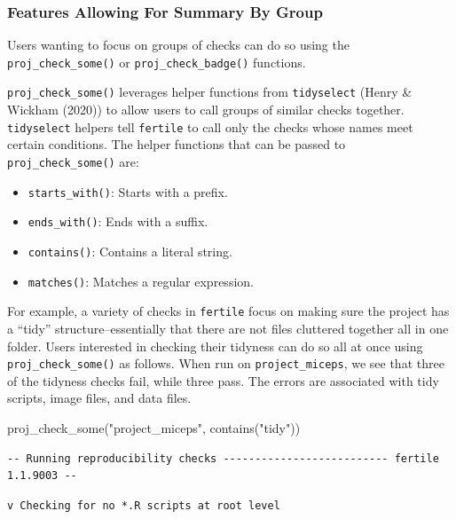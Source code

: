 \documentclass[12pt,twoside]{reedthesis}
\newenvironment{Shaded}{\begin{snugshade}}{\end{snugshade}}
\newcommand{\FunctionTok}[1]{\textcolor[rgb]{0.00,0.00,0.00}{#1}}
\newcommand{\NormalTok}[1]{#1}
\newcommand{\StringTok}[1]{\textcolor[rgb]{0.31,0.60,0.02}{#1}}
\providecommand{\tightlist}{%
  \setlength{\itemsep}{0pt}\setlength{\parskip}{0pt}}
\begin{document}
\hypertarget{features-allowing-for-summary-by-group}{%
\subsubsection{Features Allowing For Summary By Group}\label{features-allowing-for-summary-by-group}}

Users wanting to focus on groups of checks can do so using the \texttt{proj\_check\_some()} or \texttt{proj\_check\_badge()} functions.

\texttt{proj\_check\_some()} leverages helper functions from \texttt{tidyselect} (Henry \& Wickham (2020)) to allow users to call groups of similar checks together. \texttt{tidyselect} helpers tell \texttt{fertile} to call only the checks whose names meet certain conditions. The helper functions that can be passed to \texttt{proj\_check\_some()} are:
\begin{itemize}
\tightlist
\item
  \texttt{starts\_with()}: Starts with a prefix.
\item
  \texttt{ends\_with()}: Ends with a suffix.
\item
  \texttt{contains()}: Contains a literal string.
\item
  \texttt{matches()}: Matches a regular expression.
\end{itemize}
For example, a variety of checks in \texttt{fertile} focus on making sure the project has a ``tidy'' structure--essentially that there are not files cluttered together all in one folder. Users interested in checking their tidyness can do so all at once using \texttt{proj\_check\_some()} as follows. When run on \texttt{project\_miceps}, we see that three of the tidyness checks fail, while three pass. The errors are associated with tidy scripts, image files, and data files.
\begin{Shaded}
\begin{Highlighting}[]
\FunctionTok{proj\_check\_some}\NormalTok{(}\StringTok{"project\_miceps"}\NormalTok{, }\FunctionTok{contains}\NormalTok{(}\StringTok{"tidy"}\NormalTok{))}
\end{Highlighting}
\end{Shaded}
\footnotesize
\begin{verbatim}
-- Running reproducibility checks -------------------------- fertile 1.1.9003 --
\end{verbatim}
\begin{verbatim}
v Checking for no *.R scripts at root level
\end{verbatim}
\end{document}
